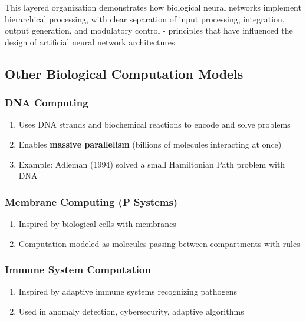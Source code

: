 This layered organization demonstrates how biological neural networks implement hierarchical processing, with clear separation of input processing, integration, output generation, and modulatory control - principles that have influenced the design of artificial neural network architectures.

\subsection{Other Biological Computation Models}
\label{subsec:other-biological-models}

\subsubsection{DNA Computing}
\label{subsubsec:dna-computing}

\begin{enumerate}
\item Uses DNA strands and biochemical reactions to encode and solve problems
\item Enables \textbf{massive parallelism} (billions of molecules interacting at once)
\item Example: Adleman (1994) solved a small Hamiltonian Path problem with DNA
\end{enumerate}

\subsubsection{Membrane Computing (P Systems)}
\label{subsubsec:membrane-computing}

\begin{enumerate}
\item Inspired by biological cells with membranes
\item Computation modeled as molecules passing between compartments with rules
\end{enumerate}

\subsubsection{Immune System Computation}
\label{subsubsec:immune-system-computation}

\begin{enumerate}
\item Inspired by adaptive immune systems recognizing pathogens
\item Used in anomaly detection, cybersecurity, adaptive algorithms
\end{enumerate}

